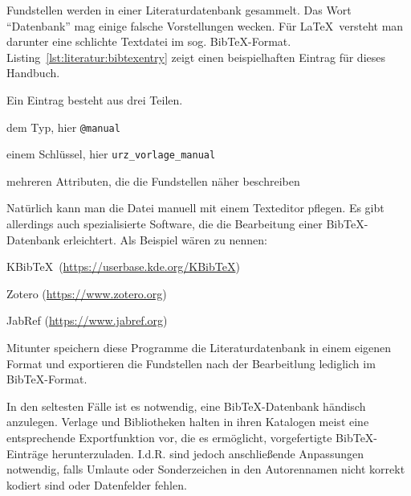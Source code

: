 Fundstellen werden in einer Literaturdatenbank gesammelt. Das Wort
"`Datenbank"' mag einige falsche Vorstellungen wecken. Für \LaTeX\ versteht man
darunter eine schlichte Textdatei im sog. Bib\TeX-Format.
Listing~\ref{lst:literatur:bibtexentry} zeigt einen beispielhaften Eintrag für
dieses Handbuch.



Ein Eintrag besteht aus drei Teilen.
%
\begin{compactenum}
\item dem Typ, hier \texttt{@manual}
\item einem Schlüssel, hier \texttt{urz\_vorlage\_manual}
\item mehreren Attributen, die die Fundstellen näher beschreiben
\end{compactenum}

Natürlich kann man die Datei manuell mit einem Texteditor pflegen. Es gibt
allerdings auch spezialisierte Software, die die Bearbeitung einer
Bib\TeX-Datenbank erleichtert. Als Beispiel wären zu nennen:
%
\begin{compactitem}
\item KBib\TeX\ (\url{https://userbase.kde.org/KBibTeX})
\item Zotero (\url{https://www.zotero.org})
\item JabRef (\url{https://www.jabref.org})
\end{compactitem}
%
Mitunter speichern diese Programme die Literaturdatenbank in einem eigenen
Format und exportieren die Fundstellen nach der Bearbeitlung lediglich im
Bib\TeX-Format.

In den seltesten Fälle ist es notwendig, eine Bib\TeX-Datenbank händisch
anzulegen. Verlage und Bibliotheken halten in ihren Katalogen meist eine
entsprechende Exportfunktion vor, die es ermöglicht, vorgefertigte
Bib\TeX-Einträge herunterzuladen. I.d.R. sind jedoch anschließende Anpassungen
notwendig, falls Umlaute oder Sonderzeichen in den Autorennamen nicht korrekt
kodiert sind oder Datenfelder fehlen.
